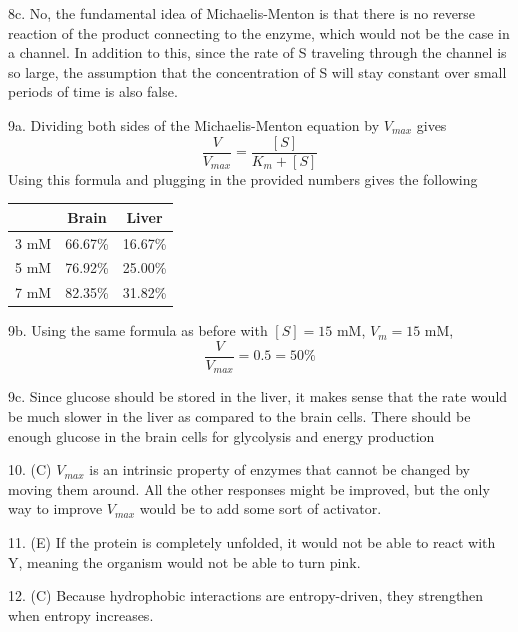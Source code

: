\documentclass{article}
\begin{document}
8c. No, the fundamental idea of Michaelis-Menton is that there is no reverse reaction of the product connecting to the enzyme, which would not be the case in a channel. In addition to this, since the rate of S traveling through the channel is so large, the assumption that the concentration of S will stay constant over small periods of time is also false.

9a. Dividing both sides of the Michaelis-Menton equation by $V_{max}$ gives 
$$\frac{V}{V_{max}}=\frac{[S]}{K_m +[S]}$$
Using this formula and plugging in the provided numbers gives the following

\begin{table}[h!]
  \centering
  \begin{tabular}{ccc}
    \toprule
    & Brain & Liver\\
    \midrule
    3 mM & 66.67\% & 16.67\%\\
    5 mM & 76.92\% & 25.00\%\\
    7 mM & 82.35\% & 31.82\%\\
    \bottomrule
  \end{tabular}
\end{table}

9b. Using the same formula as before with $[S]=15$ mM, $V_m=15$ mM,
$$\frac{V}{V_{max}}=0.5=50\%$$

9c. Since glucose should be stored in the liver, it makes sense that the rate would be much slower in the liver as compared to the brain cells. There should be enough glucose in the brain cells for glycolysis and energy production 

10. (C) $V_{max}$ is an intrinsic property of enzymes that cannot be changed by moving them around. All the other responses might be improved, but the only way to improve $V_{max}$ would be to add some sort of activator.

11. (E) If the protein is completely unfolded, it would not be able to react with Y, meaning the organism would not be able to turn pink.

12. (C) Because hydrophobic interactions are entropy-driven, they strengthen when entropy increases. 
\end{document}
